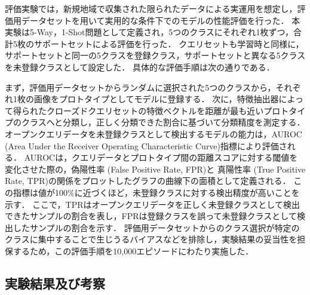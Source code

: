 \documentclass[a4paper,11pt,nomag]{jsreport}
\begin{document}
評価実験では，新規地域で収集された限られたデータによる実運用を想定し，評価用データセットを用いて実用的な条件下でのモデルの性能評価を行った．
本実験は5-Way，1-Shot問題として定義され，5つのクラスにそれぞれ1枚ずつ，合計5枚のサポートセットによる評価を行った．
クエリセットも学習時と同様に，サポートセットと同一の5クラスを登録クラス，サポートセットと異なる5クラスを未登録クラスとして設定した．
具体的な評価手順は次の通りである．

まず，評価用データセットからランダムに選択された5つのクラスから，それぞれ1枚の画像をプロトタイプとしてモデルに登録する．
次に，特徴抽出器によって得られたクローズドクエリセットの特徴ベクトルを距離が最も近いプロトタイプのクラスへと分類し，正しく分類できた割合に基づいて分類精度を測定する．
オープンクエリデータを未登録クラスとして検出するモデルの能力は，AUROC (Area Under the Receiver Operating Characteristic Curve)指標により評価される．
AUROCは，クエリデータとプロトタイプ間の距離スコアに対する閾値を変化させた際の，偽陽性率 (False Positive Rate, FPR)と
真陽性率 (True Positive Rate, TPR)の関係をプロットしたグラフの曲線下の面積として定義される．
この指標は値が100\%に近づくほど，未登録クラスに対する検出精度が高いことを示す．
ここで，TPRはオープンクエリデータを正しく未登録クラスとして検出できたサンプルの割合を表し，FPRは登録クラスを誤って未登録クラスとして検出したサンプルの割合を示す．
評価用データセットからのクラス選択が特定のクラスに集中することで生じうるバイアスなどを排除し，実験結果の妥当性を担保するため，この評価手順を10,000エピソードにわたり実施した．

\subsection{実験結果及び考察}
\end{document}

